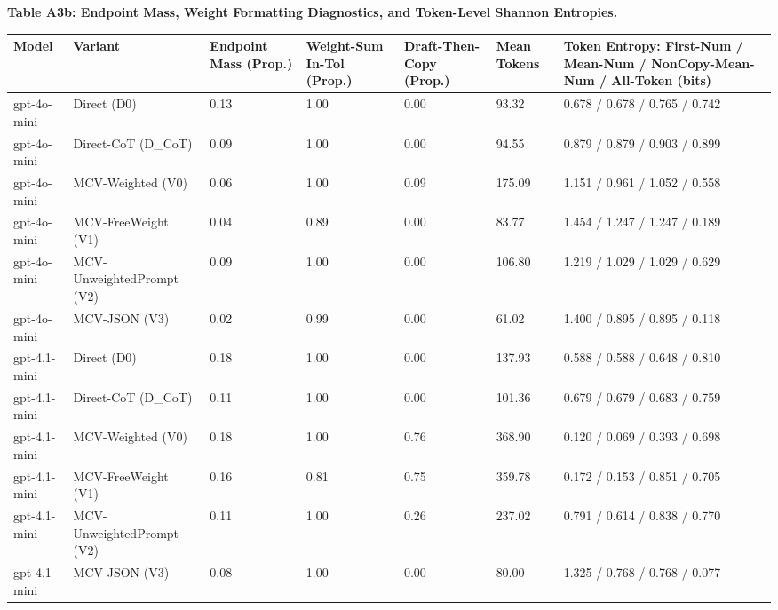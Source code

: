 \documentclass[11pt,a4paper]{article}
\begin{document}
\textbf{Table A3b: Endpoint Mass, Weight Formatting Diagnostics, and Token-Level Shannon Entropies.}

\begin{center}\begingroup\small\setlength{\tabcolsep}{4.5pt}\renewcommand{\arraystretch}{1.12}\begin{adjustbox}{max width=\textwidth}\begin{tabular}{lllllll}\toprule
\textbf{Model} & \textbf{Variant} & \textbf{Endpoint Mass (Prop.)} & \textbf{Weight-Sum In-Tol (Prop.)} & \textbf{Draft-Then-Copy (Prop.)} & \textbf{Mean Tokens} & \textbf{Token Entropy: First-Num / Mean-Num / NonCopy-Mean-Num / All-Token (bits)} \\ \midrule
gpt-4o-mini & Direct (D0) & 0.13 & 1.00 & 0.00 & 93.32 & 0.678 / 0.678 / 0.765 / 0.742 \\
gpt-4o-mini & Direct-CoT (D\_\allowbreak{}CoT) & 0.09 & 1.00 & 0.00 & 94.55 & 0.879 / 0.879 / 0.903 / 0.899 \\
gpt-4o-mini & MCV-Weighted (V0) & 0.06 & 1.00 & 0.09 & 175.09 & 1.151 / 0.961 / 1.052 / 0.558 \\
gpt-4o-mini & MCV-FreeWeight (V1) & 0.04 & 0.89 & 0.00 & 83.77 & 1.454 / 1.247 / 1.247 / 0.189 \\
gpt-4o-mini & MCV-UnweightedPrompt (V2) & 0.09 & 1.00 & 0.00 & 106.80 & 1.219 / 1.029 / 1.029 / 0.629 \\
gpt-4o-mini & MCV-JSON (V3) & 0.02 & 0.99 & 0.00 & 61.02 & 1.400 / 0.895 / 0.895 / 0.118 \\
gpt-4.1-mini & Direct (D0) & 0.18 & 1.00 & 0.00 & 137.93 & 0.588 / 0.588 / 0.648 / 0.810 \\
gpt-4.1-mini & Direct-CoT (D\_\allowbreak{}CoT) & 0.11 & 1.00 & 0.00 & 101.36 & 0.679 / 0.679 / 0.683 / 0.759 \\
gpt-4.1-mini & MCV-Weighted (V0) & 0.18 & 1.00 & 0.76 & 368.90 & 0.120 / 0.069 / 0.393 / 0.698 \\
gpt-4.1-mini & MCV-FreeWeight (V1) & 0.16 & 0.81 & 0.75 & 359.78 & 0.172 / 0.153 / 0.851 / 0.705 \\
gpt-4.1-mini & MCV-UnweightedPrompt (V2) & 0.11 & 1.00 & 0.26 & 237.02 & 0.791 / 0.614 / 0.838 / 0.770 \\
gpt-4.1-mini & MCV-JSON (V3) & 0.08 & 1.00 & 0.00 & 80.00 & 1.325 / 0.768 / 0.768 / 0.077 \\
\bottomrule\end{tabular}\end{adjustbox}\endgroup\end{center}
\end{document}
